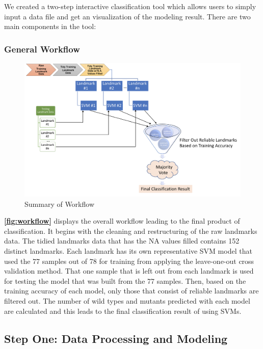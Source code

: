 \documentclass[10pt,letterpaper]{article}
\begin{document}
We created a two-step interactive classification tool which allows users
to simply input a data file and get an visualization of the modeling
result. There are two main components in the tool:

\subsubsection{General Workflow}\label{general-workflow}

\begin{figure}[h]

{\centering \includegraphics[width=5.55in]{figures/Figure1} 

}

\caption{\label{fig:workflow} Summary of Workflow}\label{fig:unnamed-chunk-4}
\end{figure}

\textbf{\autoref{fig:workflow}} displays the overall workflow leading to
the final product of classification. It begins with the cleaning and
restructuring of the raw landmarks data. The tidied landmarks data that
has the NA values filled contains 152 distinct landmarks. Each landmark
has its own representative SVM model that used the 77 samples out of 78
for training from applying the leave-one-out cross validation method.
That one sample that is left out from each landmark is used for testing
the model that was built from the 77 samples. Then, based on the
training accuracy of each model, only those that consist of reliable
landmarks are filtered out. The number of wild types and mutants
predicted with each model are calculated and this leads to the final
classification result of using SVMs.

\subsection{Step One: Data Processing and
Modeling}\label{step-one-data-processing-and-modeling}
\end{document}
